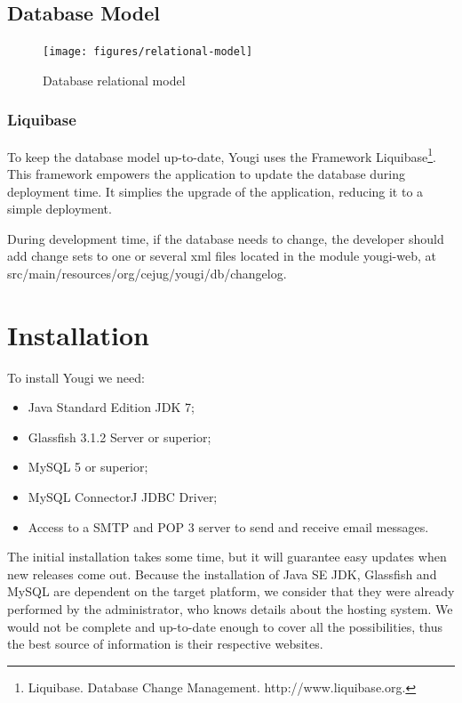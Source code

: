 \documentclass[envcountsame,envcountchap]{svmono}
\begin{document}
\section{Database Model}

\begin{figure}
\centering
\texttt{[image: figures/relational-model]}
\caption{Database relational model}
\label{fig:relational-model}
\end{figure}

\subsection{Liquibase}

To keep the database model up-to-date, Yougi uses the Framework Liquibase\footnote{Liquibase. Database Change Management.  http://www.liquibase.org.}. This framework empowers the application to update the database during deployment time. It simplies the upgrade of the application, reducing it to a simple deployment.

During development time, if the database needs to change, the developer should add change sets to one or several xml files located in the module yougi-web, at src/main/resources/org/cejug/yougi/db/changelog.

\chapter{Installation}
\label{chp:installation}

To install Yougi we need:

\begin{itemize}
\item Java Standard Edition JDK 7;
\item Glassfish 3.1.2 Server or superior;
\item MySQL 5 or superior;
\item MySQL ConnectorJ JDBC Driver;
\item Access to a SMTP and POP 3 server to send and receive email messages.
\end{itemize}

The initial installation takes some time, but it will guarantee easy updates when new releases come out. Because the installation of Java SE JDK, Glassfish and MySQL are dependent on the target platform, we consider that they were already performed by the administrator, who knows details about the hosting system. We would not be complete and up-to-date enough to cover all the possibilities, thus the best source of information is their respective websites. 
\end{document}
